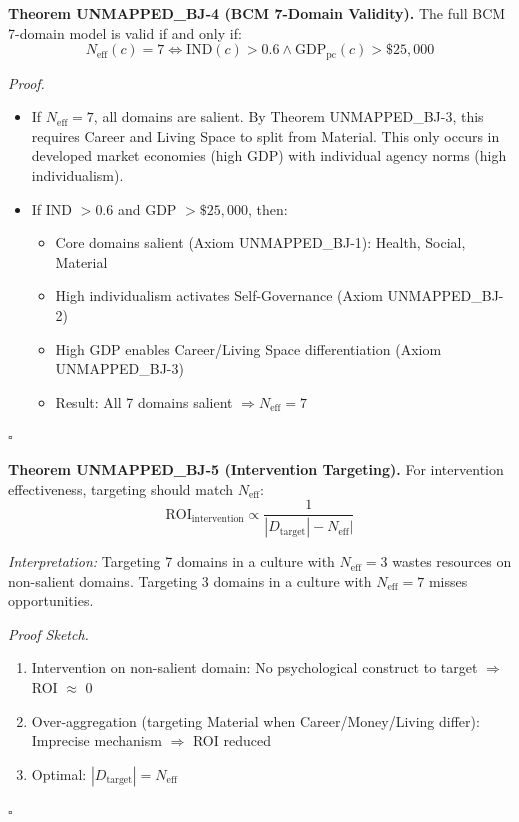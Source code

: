 \begin{tcolorbox}[colback=green!5!white, colframe=green!75!black, title=Theorem UNMAPPED_BJ-4: BCM Validity Conditions]
\textbf{Theorem UNMAPPED_BJ-4 (BCM 7-Domain Validity).}
The full BCM 7-domain model is valid if and only if:
\begin{equation}
N_{\text{eff}}(c) = 7 \iff \text{IND}(c) > 0.6 \land \text{GDP}_{\text{pc}}(c) > \$25,000
\end{equation}

\textit{Proof.}
\begin{itemize}[nosep]
\item[$(\Rightarrow)$] If $N_{\text{eff}} = 7$, all domains are salient. By Theorem UNMAPPED_BJ-3, this requires
                       Career and Living Space to split from Material. This only occurs in developed
                       market economies (high GDP) with individual agency norms (high individualism).
\item[$(\Leftarrow)$] If IND $> 0.6$ and GDP $> \$25,000$, then:
  \begin{itemize}[nosep]
    \item Core domains salient (Axiom UNMAPPED_BJ-1): Health, Social, Material
    \item High individualism activates Self-Governance (Axiom UNMAPPED_BJ-2)
    \item High GDP enables Career/Living Space differentiation (Axiom UNMAPPED_BJ-3)
    \item Result: All 7 domains salient $\Rightarrow N_{\text{eff}} = 7$
  \end{itemize}
\end{itemize}
\hfill $\square$
\end{tcolorbox}

\begin{tcolorbox}[colback=green!5!white, colframe=green!75!black, title=Theorem UNMAPPED_BJ-5: Intervention Targeting Optimality]
\textbf{Theorem UNMAPPED_BJ-5 (Intervention Targeting).}
For intervention effectiveness, targeting should match $N_{\text{eff}}$:
\begin{equation}
\text{ROI}_{\text{intervention}} \propto \frac{1}{|D_{\text{target}}| - N_{\text{eff}}|}
\end{equation}

\textit{Interpretation:} Targeting 7 domains in a culture with $N_{\text{eff}} = 3$ wastes resources
on non-salient domains. Targeting 3 domains in a culture with $N_{\text{eff}} = 7$ misses opportunities.

\textit{Proof Sketch.}
\begin{enumerate}[nosep]
\item Intervention on non-salient domain: No psychological construct to target $\Rightarrow$ ROI $\approx$ 0
\item Over-aggregation (targeting Material when Career/Money/Living differ): Imprecise mechanism $\Rightarrow$ ROI reduced
\item Optimal: $|D_{\text{target}}| = N_{\text{eff}}$
\end{enumerate}
\hfill $\square$
\end{tcolorbox}

